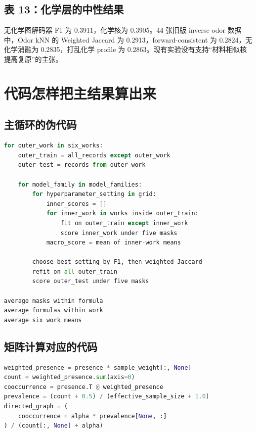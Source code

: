 \documentclass[UTF8,11pt,openany,fontset=none]{ctexbook}
\begin{document}
\section{表 13：化学层的中性结果}

无化学图解码器 F1 为 0.3911，化学核为 0.3905。44 张旧版 inverse odor 数据中，Odor kNN 的 Weighted Jaccard 为 0.2913，forward-consistent 为 0.2824，无化学消融为 0.2835，打乱化学 profile 为 0.2863。现有实验没有支持“材料相似核提高复原”的主张。

\chapter{代码怎样把主结果算出来}

\section{主循环的伪代码}

\begin{lstlisting}[language=Python]
for outer_work in six_works:
    outer_train = all_records except outer_work
    outer_test = records from outer_work

    for model_family in model_families:
        for hyperparameter_setting in grid:
            inner_scores = []
            for inner_work in works inside outer_train:
                fit on outer_train except inner_work
                score inner_work under five masks
            macro_score = mean of inner-work means

        choose best setting by F1, then weighted Jaccard
        refit on all outer_train
        score outer_test under five masks

average masks within formula
average formulas within work
average six work means
\end{lstlisting}

\section{矩阵计算对应的代码}

\begin{lstlisting}[language=Python]
weighted_presence = presence * sample_weight[:, None]
count = weighted_presence.sum(axis=0)
cooccurrence = presence.T @ weighted_presence
prevalence = (count + 0.5) / (effective_sample_size + 1.0)
directed_graph = (
    cooccurrence + alpha * prevalence[None, :]
) / (count[:, None] + alpha)
\end{lstlisting}
\end{document}
